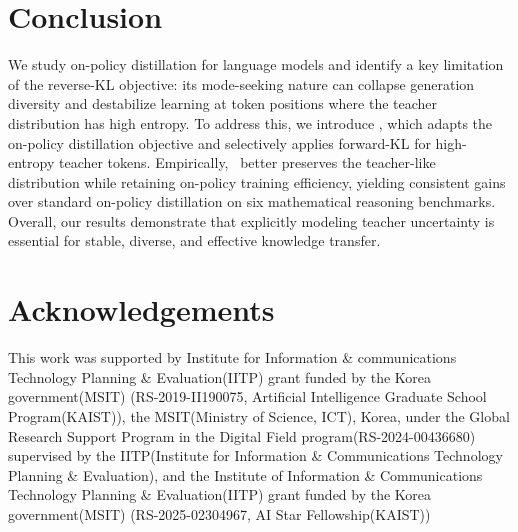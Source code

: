 \section{Conclusion}
We study on-policy distillation for language models and identify a key limitation of the reverse-KL objective:
its mode-seeking nature can collapse generation diversity and destabilize learning at token positions where the teacher distribution has high entropy.
To address this, we introduce \method, which adapts the on-policy distillation objective and selectively applies forward-KL for high-entropy teacher tokens. Empirically, \method~better preserves the teacher-like distribution while retaining on-policy training efficiency, yielding consistent gains over standard on-policy distillation on six mathematical reasoning benchmarks.
Overall, our results demonstrate that explicitly modeling teacher uncertainty is essential for stable, diverse, and effective knowledge transfer.

\section*{Acknowledgements}
This work was supported by Institute for Information \& communications Technology Planning \& Evaluation(IITP) grant funded by the Korea government(MSIT) (RS-2019-II190075, Artificial Intelligence Graduate School Program(KAIST)), the MSIT(Ministry of Science, ICT), Korea, under the Global Research Support Program in the Digital Field program(RS-2024-00436680) supervised by the IITP(Institute for Information \& Communications Technology Planning \& Evaluation), and the Institute of Information \& Communications Technology Planning \& Evaluation(IITP) grant funded by the Korea government(MSIT) (RS-2025-02304967, AI Star Fellowship(KAIST))